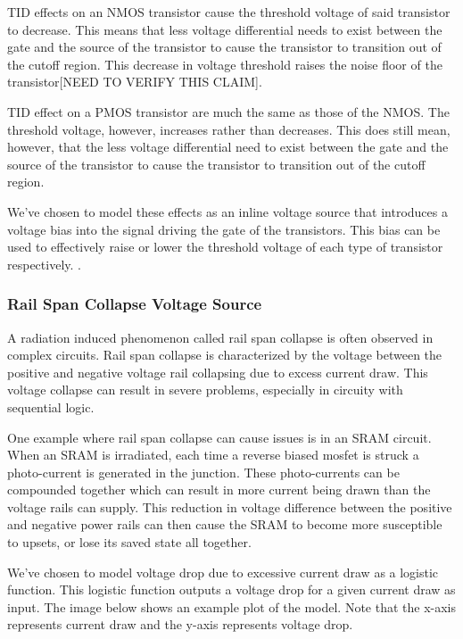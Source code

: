 \documentclass[conference]{IEEEtran}
\begin{document}
    TID effects on an NMOS transistor cause the threshold voltage of said transistor to decrease.
    This means that less voltage differential needs to exist between the gate and the source of the transistor to cause the transistor to transition out of the cutoff region.
    This decrease in voltage threshold raises the noise floor of the transistor[NEED TO VERIFY THIS CLAIM].

    TID effect on a PMOS transistor are much the same as those of the NMOS. The threshold voltage, however, increases rather than decreases.
    This does still mean, however, that the less voltage differential need to exist between the gate and the source of the transistor to cause the transistor to transition out of the cutoff region.

    We've chosen to model these effects as an inline voltage source that introduces a voltage bias into the signal driving the gate of the transistors.
    This bias can be used to effectively raise or lower the threshold voltage of each type of transistor respectively.
    \cite{Pepper1990}.

    \vspace{1em}

    \subsubsection{Rail Span Collapse Voltage Source}
    A radiation induced phenomenon called rail span collapse is often observed in complex circuits.
    Rail span collapse is characterized by the voltage between the positive and negative voltage rail collapsing due to excess current draw.
    This voltage collapse can result in severe problems, especially in circuity with sequential logic.

    One example where rail span collapse can cause issues is in an SRAM circuit.
    When an SRAM is irradiated, each time a reverse biased mosfet is struck a photo-current is generated in the junction.
    These photo-currents can be compounded together which can result in more current being drawn than the voltage rails can supply.
    This reduction in voltage difference between the positive and negative power rails can then cause the SRAM to become more susceptible to upsets, or lose its saved state all together.

    We've chosen to model voltage drop due to excessive current draw as a logistic function.
    This logistic function outputs a voltage drop for a given current draw as input.
    The image below shows an example plot of the model.
    Note that the x-axis represents current draw and the y-axis represents voltage drop.
\end{document}
